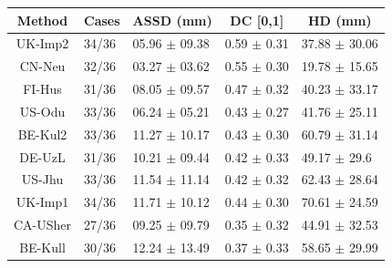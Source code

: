 \documentclass[11pt]{article}
\begin{document}
\begin{table}[htp]
	\centering
	\begin{tabular}{cllll}
		\textbf{Method} & \multicolumn{1}{c}{\textbf{Cases}} & \multicolumn{1}{c}{\textbf{ASSD (mm)}} & \multicolumn{1}{c}{\textbf{DC {[}0,1{]}}} & \multicolumn{1}{c}{\textbf{HD (mm)}} \\ \hline
		UK-Imp2         & 34/36                              & 05.96 $\pm$ 09.38                         & 0.59 $\pm$ 0.31                              & 37.88 $\pm$ 30.06                       \\ \hline
		CN-Neu          & 32/36                              & 03.27 $\pm$ 03.62                         & 0.55 $\pm$ 0.30                              & 19.78 $\pm$ 15.65                       \\ \hline
		FI-Hus          & 31/36                              & 08.05 $\pm$ 09.57                         & 0.47 $\pm$ 0.32                              & 40.23 $\pm$ 33.17                       \\ \hline
		US-Odu          & 33/36                              & 06.24 $\pm$ 05.21                         & 0.43 $\pm$ 0.27                              & 41.76 $\pm$ 25.11                       \\ \hline
		BE-Kul2         & 33/36                              & 11.27 $\pm$ 10.17                         & 0.43 $\pm$ 0.30                              & 60.79 $\pm$ 31.14                       \\ \hline
		DE-UzL          & 31/36                              & 10.21 $\pm$ 09.44                         & 0.42 $\pm$ 0.33                              & 49.17 $\pm$ 29.6                        \\ \hline
		US-Jhu          & 33/36                              & 11.54 $\pm$ 11.14                         & 0.42 $\pm$ 0.32                              & 62.43 $\pm$ 28.64                       \\ \hline
		UK-Imp1         & 34/36                              & 11.71 $\pm$ 10.12                         & 0.44 $\pm$ 0.30                              & 70.61 $\pm$ 24.59                       \\ \hline
		CA-USher        & 27/36                              & 09.25 $\pm$ 09.79                         & 0.35 $\pm$ 0.32                              & 44.91 $\pm$ 32.53                       \\ \hline
		BE-Kull         & 30/36                              & 12.24 $\pm$ 13.49                         & 0.37 $\pm$ 0.33                              & 58.65 $\pm$ 29.99                       \\ \hline

\end{tabular}
\end{table}
\end{document}
